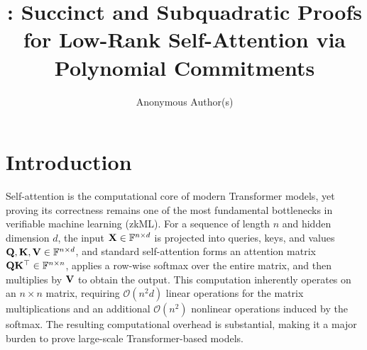 \documentclass[letterpaper,twocolumn,10pt]{article}
\begin{document}
\title{\Large \bf \name : Succinct and Subquadratic Proofs for Low-Rank Self-Attention via Polynomial Commitments}

\author{
{\rm Anonymous Author(s)}\\
}
\maketitle

\begin{abstract}




\end{abstract}
\section{Introduction}
Self-attention is the computational core of modern Transformer models, yet proving its correctness remains one of the most fundamental bottlenecks in verifiable machine learning (zkML). For a sequence of length $n$ and hidden dimension $d$, the input ${\mathbf{X}} \in \mathbb{F}^{n \times d}$ is projected into queries, keys, and values ${\mathbf{Q}}, {\mathbf{K}}, {\mathbf{V}} \in \mathbb{F}^{n \times d}$, and standard self-attention forms an attention matrix ${\mathbf{Q}}{\mathbf{K}}^\top \in \mathbb{F}^{n\times n}$, applies a row-wise softmax over the entire matrix, and then multiplies by ${\mathbf{V}}$ to obtain the output. This computation inherently operates on an $n \times n$ matrix, requiring $\mathcal{O}(n^2 d)$ linear operations for the matrix multiplications and an additional $\mathcal{O}(n^2)$ nonlinear operations induced by the softmax. The resulting computational overhead is substantial, making it a major burden to prove large-scale Transformer-based models.
\end{document}
